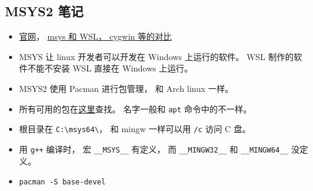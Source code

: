 \subsection{MSYS2 笔记}
\begin{itemize}
\item \href{https://www.msys2.org/}{官网}， \href{https://www.msys2.org/docs/what-is-msys2/}{msys 和 WSL， cygwin 等的对比}
\item MSYS 让 linux 开发者可以开发在 Windows 上运行的软件。 WSL 制作的软件不能不安装 WSL 直接在 Windows 上运行。
\item MSYS2 使用 Pacman 进行包管理， 和 Arch linux 一样。
\item 所有可用的包在\href{https://packages.msys2.org/queue}{这里}查找。 名字一般和 \verb|apt| 命令中的不一样。
\item 根目录在 \verb|C:\msys64\|， 和 mingw 一样可以用 \verb|/c| 访问 C 盘。
\item 用 \verb|g++| 编译时， 宏 \verb|__MSYS__| 有定义， 而 \verb|__MINGW32__| 和 \verb|__MINGW64__| 没定义。
\item \verb|pacman -S base-devel|
\end{itemize}
